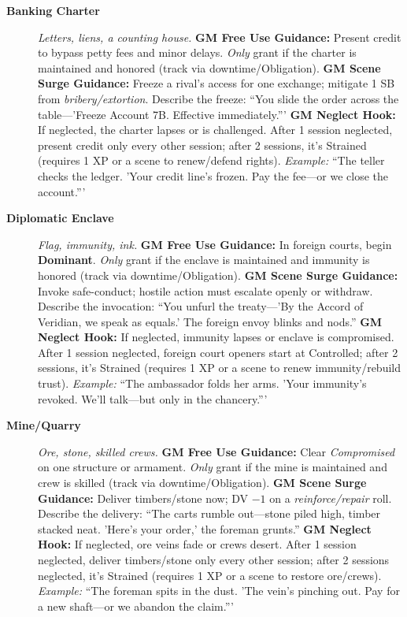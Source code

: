 \begin{description}
  \item[\textbf{Banking Charter}]   
        \emph{Letters, liens, a counting house.}  
        \textbf{GM Free Use Guidance:} Present credit to bypass petty fees and minor delays. \emph{Only} grant if the charter is maintained and honored (track via downtime/Obligation).  
        \textbf{GM Scene Surge Guidance:} Freeze a rival's access for one exchange; mitigate 1 SB from \emph{bribery/extortion}. Describe the freeze: ``You slide the order across the table---'Freeze Account 7B. Effective immediately.'''  
        \textbf{GM Neglect Hook:} If neglected, the charter lapses or is challenged. After 1 session neglected, present credit only every other session; after 2 sessions, it's Strained (requires 1 XP or a scene to renew/defend rights).  
        \textit{Example:} ``The teller checks the ledger. 'Your credit line's frozen. Pay the fee---or we close the account.'''  

  \item[\textbf{Diplomatic Enclave}]   
        \emph{Flag, immunity, ink.}  
        \textbf{GM Free Use Guidance:} In foreign courts, begin \textbf{Dominant}. \emph{Only} grant if the enclave is maintained and immunity is honored (track via downtime/Obligation).  
        \textbf{GM Scene Surge Guidance:} Invoke safe-conduct; hostile action must escalate openly or withdraw. Describe the invocation: ``You unfurl the treaty---'By the Accord of Veridian, we speak as equals.' The foreign envoy blinks and nods.''  
        \textbf{GM Neglect Hook:} If neglected, immunity lapses or enclave is compromised. After 1 session neglected, foreign court openers start at Controlled; after 2 sessions, it's Strained (requires 1 XP or a scene to renew immunity/rebuild trust).  
        \textit{Example:} ``The ambassador folds her arms. 'Your immunity's revoked. We'll talk---but only in the chancery.'''  

  \item[\textbf{Mine/Quarry}]   
        \emph{Ore, stone, skilled crews.}  
        \textbf{GM Free Use Guidance:} Clear \emph{Compromised} on one structure or armament. \emph{Only} grant if the mine is maintained and crew is skilled (track via downtime/Obligation).  
        \textbf{GM Scene Surge Guidance:} Deliver timbers/stone now; DV $-1$ on a \emph{reinforce/repair} roll. Describe the delivery: ``The carts rumble out---stone piled high, timber stacked neat. 'Here's your order,' the foreman grunts.''  
        \textbf{GM Neglect Hook:} If neglected, ore veins fade or crews desert. After 1 session neglected, deliver timbers/stone only every other session; after 2 sessions neglected, it's Strained (requires 1 XP or a scene to restore ore/crews).  
        \textit{Example:} ``The foreman spits in the dust. 'The vein's pinching out. Pay for a new shaft---or we abandon the claim.'''  


\end{description}
